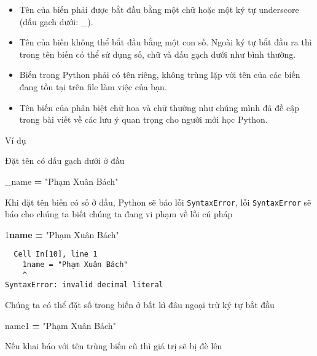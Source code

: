 \documentclass[
]{book}
\newenvironment{Shaded}{\begin{snugshade}}{\end{snugshade}}
\newcommand{\DecValTok}[1]{\textcolor[rgb]{0.00,0.00,0.81}{#1}}
\newcommand{\ErrorTok}[1]{\textcolor[rgb]{0.64,0.00,0.00}{\textbf{#1}}}
\newcommand{\NormalTok}[1]{#1}
\newcommand{\OperatorTok}[1]{\textcolor[rgb]{0.81,0.36,0.00}{\textbf{#1}}}
\newcommand{\StringTok}[1]{\textcolor[rgb]{0.31,0.60,0.02}{#1}}
\providecommand{\tightlist}{%
  \setlength{\itemsep}{0pt}\setlength{\parskip}{0pt}}
\begin{document}
\begin{itemize}
\tightlist
\item
  Tên của biến phải được bắt đầu bằng một chữ hoặc một ký tự underscore (dấu gạch dưới: \_).
\item
  Tên của biến không thể bắt đầu bằng một con số. Ngoài ký tự bắt đầu ra thì trong tên biến có thể sử dụng số, chữ và dấu gạch dưới như bình thường.
\item
  Biến trong Python phải có tên riêng, không trùng lặp với tên của các biến đang tồn tại trên file làm việc của bạn.
\item
  Tên biến của phân biệt chữ hoa và chữ thường như chúng mình đã đề cập trong bài viết về các lưu ý quan trọng cho người mới học Python.
\end{itemize}

Ví dụ

Đặt tên có dấu gạch dưới ở đầu

\begin{Shaded}
\begin{Highlighting}[]
\NormalTok{\_name }\OperatorTok{=} \StringTok{"Phạm Xuân Bách"}
\end{Highlighting}
\end{Shaded}

Khi đặt tên biến có số ở đầu, Python sẽ báo lỗi \texttt{SyntaxError}, lỗi \texttt{SyntaxError} sẽ báo cho chúng ta biết chúng ta đang vi phạm về lỗi cú pháp

\begin{Shaded}
\begin{Highlighting}[]
\DecValTok{1}\ErrorTok{name} \OperatorTok{=} \StringTok{"Phạm Xuân Bách"}
\end{Highlighting}
\end{Shaded}

\begin{verbatim}
  Cell In[10], line 1
    1name = "Phạm Xuân Bách"
    ^
SyntaxError: invalid decimal literal
\end{verbatim}

Chúng ta có thể đặt số trong biến ở bất kì đâu ngoại trừ ký tự bắt đầu

\begin{Shaded}
\begin{Highlighting}[]
\NormalTok{name1 }\OperatorTok{=} \StringTok{"Phạm Xuân Bách"}
\end{Highlighting}
\end{Shaded}

Nếu khai báo với tên trùng biến cũ thì giá trị sẽ bị đè lên
\end{document}
